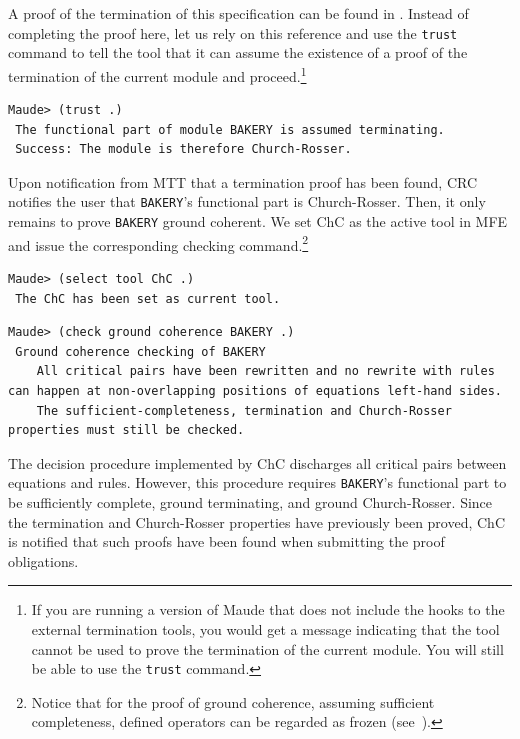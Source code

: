 \documentclass{llncs}
\newcommand{\ignore}[1]{}
\begin{document}
A proof of the termination of this specification can be found in
\cite{Duran-Meseguer:2011}. Instead of completing the proof here, 
let us rely on this reference and use the \verb~trust~ command to tell the tool that it can assume 
the existence of a proof of the termination of the current module and 
proceed.\footnote{If you are running a version of Maude that does not include the hooks to the external termination tools, you would get a message indicating that the tool cannot be used to prove the termination of the current module. You will still be able to use the \texttt{trust} command.}


\begin{lstlisting}[style=AMMA, language=MaudeCommand, numbers=none]
 Maude> (trust .)
 The functional part of module BAKERY is assumed terminating.
 Success: The module is therefore Church-Rosser.
\end{lstlisting}
%
Upon notification from MTT that a termination
proof has been found, CRC notifies the user that 
\verb"BAKERY"'s functional part is Church-Rosser.
Then, it only remains to prove \verb"BAKERY" ground
coherent. We set ChC as the active tool in MFE and
issue the corresponding checking command.\footnote{Notice that for the proof of ground coherence, assuming 
sufficient completeness, defined operators can be regarded as frozen (see~\cite{Duran-Meseguer:2010-wrla-chc}).}

\ignore{When the MTT gets the \verb"trust" command or finds a proof for its goal, 
it informs all requesters of the current goal. In this case, the CRC 
was expecting it. When it receives the corresponding message it concludes 
on the confluence of the \verb"BAKERY" module, and with it on the satisfaction 
of the Church-Rosser property.

The only pending property is ground coherence. We can select the ChC tool and request the check. In this case the tool indicates that the specification satisfies the sufficient conditions for ground coherence.}

\begin{lstlisting}[style=AMMA, language=MaudeCommand, numbers=none]
 Maude> (select tool ChC .)
 The ChC has been set as current tool.
\end{lstlisting}

\begin{lstlisting}[style=AMMA, language=MaudeCommand, numbers=none]
 Maude> (check ground coherence BAKERY .)
 Ground coherence checking of BAKERY
    All critical pairs have been rewritten and no rewrite with rules can happen at non-overlapping positions of equations left-hand sides.
    The sufficient-completeness, termination and Church-Rosser properties must still be checked.
\end{lstlisting}
%
The decision procedure implemented by ChC discharges all critical
pairs between equations and rules. However, this procedure requires
\verb"BAKERY"'s functional part to be sufficiently complete, ground terminating, and ground Church-Rosser.
Since the termination and Church-Rosser properties have previously been proved,
ChC is notified that such proofs have been 
found when submitting the proof obligations.
\end{document}
